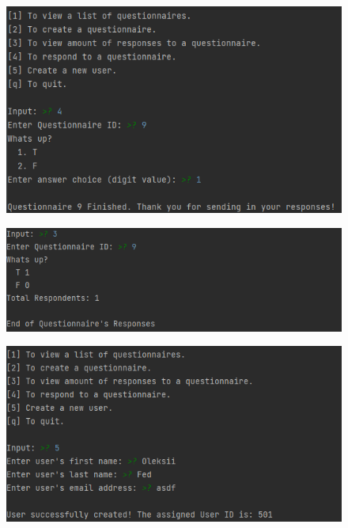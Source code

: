 \documentclass[12pt, oneside, a4paper]{article}
\begin{document}
    \begin{figure}[H] 
        \centerline{
        \includegraphics[width=\textwidth]{console_response.PNG}
        }
    \end{figure}
    \FloatBarrier
    \begin{figure}[H] 
        \centerline{
        \includegraphics[width=\textwidth]{console_stats.PNG}
        }
    \end{figure}
    \FloatBarrier
    \begin{figure}[H] 
        \centerline{
        \includegraphics[width=\textwidth]{console_create_user.PNG}
        }
    \end{figure}
\end{document}
